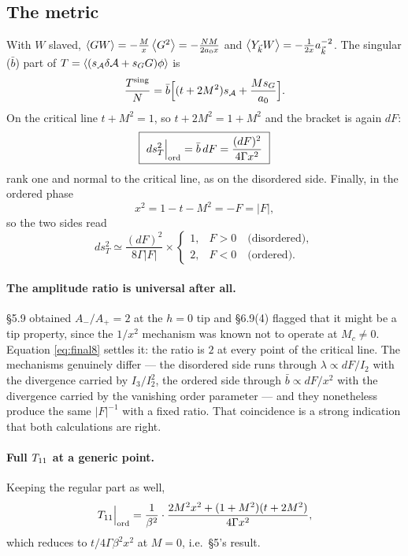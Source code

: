 \subsection{The metric}
With $W$ slaved, $\left\langle GW \right\rangle=-\tfrac{M}{x}\left\langle G^{2} \right\rangle=-\tfrac{NM}{2a_0x}$ and
$\left\langle Y_{\vec k}W \right\rangle=-\tfrac{1}{2x}a_{\vec k}^{-2}$. The singular ($\bar b$) part of
$T=\left\langle (s_{\mathcal{A}}\delta\mathcal{A}+s_GG)\phi \right\rangle$ is
\begin{equation}
  \frac{T^{\rm sing}}{N}=\bar b\Big[(t+2M^{2})s_{\mathcal{A}}+\frac{Ms_G}{a_0}\Big] .
\end{equation}
On the critical line $t+M^{2}=1$, so $t+2M^{2}=1+M^{2}$ and the bracket is again $dF$:
\begin{equation}
  \boxed{\ ds_T^{2}\Big|_{\rm ord}=\bar b\,dF=\frac{(dF)^{2}}{4\Gamma x^{2}}\ }
\end{equation}
rank one and normal to the critical line, as on the disordered side. Finally, in the
ordered phase
\begin{equation}
  x^{2}=1-t-M^{2}=-F=|F| ,
\end{equation}
so the two sides read
\begin{equation}
  \boxed{\ ds_T^{2}\simeq\frac{(dF)^{2}}{8\Gamma|F|}\times
  \begin{cases}
    1, & F>0 \quad\text{(disordered)},\\
    2, & F<0 \quad\text{(ordered)} .
  \end{cases}\ }
  \label{eq:final8}
\end{equation}

\paragraph{The amplitude ratio is universal after all.} \S5.9 obtained $A_-/A_+=2$ at the
$h=0$ tip and \S6.9(4) flagged that it might be a tip property, since the $1/x^{2}$
mechanism was known not to operate at $M_c\neq0$. Equation \eqref{eq:final8} settles it: the
ratio is $2$ at every point of the critical line. The mechanisms genuinely differ --- the
disordered side runs through $\lambda\propto dF/I_2$ with the divergence carried by
$I_3/I_2^{2}$, the ordered side through $\bar b\propto dF/x^{2}$ with the divergence carried
by the vanishing order parameter --- and they nonetheless produce the same $|F|^{-1}$ with a
fixed ratio. That coincidence is a strong indication that both calculations are right.

\paragraph{Full $T_{11}$ at a generic point.} Keeping the regular part as well,
\begin{equation}
  T_{11}\Big|_{\rm ord}=\frac{1}{\beta^{2}}\cdot
  \frac{2M^{2}x^{2}+(1+M^{2})(t+2M^{2})}{4\Gamma x^{2}} ,
\end{equation}
which reduces to $t/4\Gamma\beta^{2}x^{2}$ at $M=0$, i.e.\ \S5's result. \checkmark

